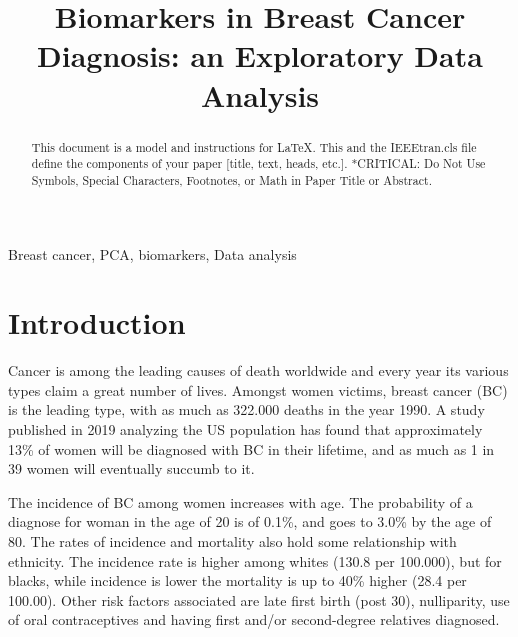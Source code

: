 \documentclass[conference]{IEEEtran}
\begin{document}
\title{Biomarkers in Breast Cancer Diagnosis: an Exploratory Data Analysis\\}

\author{
}

\maketitle

\begin{abstract}
This document is a model and instructions for \LaTeX.
This and the IEEEtran.cls file define the components of your paper [title, text, heads, etc.]. *CRITICAL: Do Not Use Symbols, Special Characters, Footnotes, 
or Math in Paper Title or Abstract.
\end{abstract}

\begin{IEEEkeywords}
Breast cancer, PCA, biomarkers, Data analysis
\end{IEEEkeywords}

\section{Introduction}
Cancer is among the leading causes of death worldwide and every 
year its various types claim a great number of lives. Amongst 
women victims, breast cancer (BC) is the leading type, with as much 
as 322.000 deaths in the year 1990\cite{murray1997mortality}. A 
study published in 2019 analyzing the US population has found 
that approximately 13\% of women will be diagnosed with BC in their 
lifetime, and as much as 1 in 39 women will 
eventually succumb to it\cite{desantis2019breast}.

The incidence of BC among women increases with age. 
The probability of a diagnose for woman in the age of 20 is of 
0.1\%, and goes to 3.0\% by the age of 80. The rates of incidence 
and mortality also hold some relationship with ethnicity. The 
incidence rate is higher among whites (130.8 per 100.000), 
but for blacks, while incidence is lower the mortality is up 
to 40\% higher (28.4 per 100.00)\cite{desantis2019breast}. 
Other risk factors associated are late first birth (post 30), 
nulliparity, use of oral contraceptives and having first and/or 
second-degree relatives diagnosed\cite{vogel2018epidemiology}.
\end{document}
